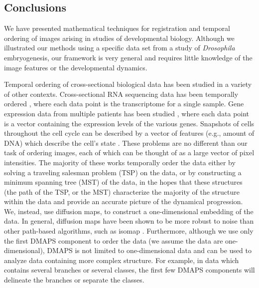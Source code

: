 \documentclass{pnastwo}
\begin{document}
\begin{article}
\section{Conclusions}

We have presented mathematical techniques for registration and temporal ordering of images arising in studies of developmental biology.
%
Although we illustrated our methods using a specific data set from a study of {\em Drosophila} embryogenesis, our framework is very general and requires little knowledge of the image features or the developmental dynamics.

Temporal ordering of cross-sectional biological data has been studied in a variety of other contexts.
%
Cross-sectional RNA sequencing data has been temporally ordered \cite{anavy2014blind}, where each data point is the transcriptome for a single sample.
%
Gene expression data from multiple patients has been studied \cite{gupta2008extracting} \cite{qiu2011discovering},
%
where each data point is a vector containing the expression levels of the various genes.
%
Snapshots of cells throughout the cell cycle can be described by a vector of features (e.g., amount of DNA) which describe the cell's state  \cite{kafri2013dynamics}.
%
These problems are no different than our task of ordering images, each of which can be thought of as a large vector of pixel intensities. 
%
The majority of these works temporally order the data either by solving a traveling salesman problem (TSP) on the data, or by constructing a minimum spanning tree (MST) of the data, 
in the hopes that these structures (the path of the TSP, or the MST) characterize the majority of the structure within the data and provide an accurate picture of the dynamical progression.
%
We, instead, use diffusion maps, to construct a one-dimensional embedding of the data.
%
In general, diffusion maps have been shown to be more robust to noise than other path-based algorithms, such as isomap \cite{tenenbaum2000global} \cite{balasubramanian2002isomap}.
%
Furthermore, although we use only the first DMAPS component to order the data (we assume the data are one-dimensional), DMAPS is not limited to one-dimensional data and can be used to analyze data containing more complex structure.
%
For example, in data which contains several branches or several classes, the first few DMAPS components will delineate the branches or separate the classes.


\end{article}
\end{document}
